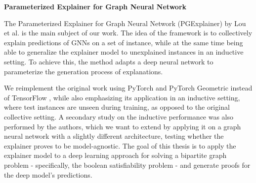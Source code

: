 \textbf{Parameterized Explainer for Graph Neural Network} \par
The Parameterized Explainer for Graph Neural Network (PGExplainer) by Lou et al. \cite{luo2020parameterized} is the main subject of our work. The idea of the framework is to collectively explain predictions of GNNs on a set of instance, while at the same time being able to generalize the explainer model to unexplained instances in an inductive setting. To achieve this, the method adapts a deep neural network to parameterize the generation process of explanations. %

We reimplement the original work using PyTorch \cite{paszke2019pytorch} and PyTorch Geometric \cite{Fey/Lenssen/2019} instead of TensorFlow \cite{tensorflow2015-whitepaper}, while also emphasizing its application in an inductive setting, where test instances are unseen during training, as opposed to the original collective setting. A secondary study on the inductive performance was also performed by the authors, which we want to extend by applying it on a graph neural network with a slightly different architecture, testing whether the explainer proves to be model-agnostic. The goal of this thesis is to apply the explainer model to a deep learning approach for solving a bipartite graph problem - specifically, the boolean satisfiability problem - and generate proofs for the deep model's predictions. \bigskip


